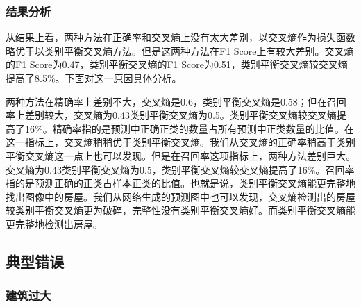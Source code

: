 \subsubsection{结果分析}
\begin{table}[htbp]
    
    \centering
    \caption{试验结果}
    \label{Tab:result_compare}
    
\end{table}
从结果上看，两种方法在正确率和交叉熵上没有太大差别，以交叉熵作为损失函数略优于以类别平衡交叉熵方法。但是这两种方法在F1 Score上有较大差别。交叉熵的F1 Score为0.47，类别平衡交叉熵的F1 Score为0.51，类别平衡交叉熵较交叉熵提高了8.5\%。下面对这一原因具体分析。

两种方法在精确率上差别不大，交叉熵是0.6，类别平衡交叉熵是0.58；但在召回率上差别较大，交叉熵为0.43类别平衡交叉熵为0.5。类别平衡交叉熵较交叉熵提高了16\%。精确率指的是预测中正确正类的数量占所有预测中正类数量的比值。在这一指标上，交叉熵稍稍优于类别平衡交叉熵。我们从交叉熵的正确率稍高于类别平衡交叉熵这一点上也可以发现。但是在召回率这项指标上，两种方法差别巨大。交叉熵为0.43类别平衡交叉熵为0.5，类别平衡交叉熵较交叉熵提高了16\%。召回率指的是预测正确的正类占样本正类的比值。也就是说，类别平衡交叉熵能更完整地找出图像中的房屋。我们从网络生成的预测图中也可以发现，交叉熵检测出的房屋较类别平衡交叉熵更为破碎，完整性没有类别平衡交叉熵好。而类别平衡交叉熵能更完整地检测出房屋。
\subsection{典型错误}
\subsubsection{建筑过大}

